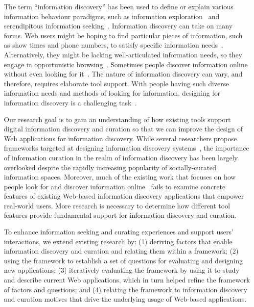 \documentclass[review]{elsarticle}
\begin{document}
The term ``information discovery'' has been used to define or explain various information behaviour paradigms, such as information exploration~\cite{waterworth1991model} and serendipitous information seeking~\cite{foster2003serendipity}.  
Information discovery can take on many forms. Web users might be hoping to find particular pieces of information, such as show times and phone numbers, to satisfy specific information needs~\cite{proper1999information}. Alternatively, they might be lacking well-articulated information needs, so they engage in opportunistic browsing~\cite{lindley2012s}. Sometimes people discover information online without even looking for it~\cite{bates1986exploratory}. The nature of information discovery can vary, and therefore, requires elaborate tool support. With people having such diverse information needs and methods of looking for information, designing for information discovery is a challenging task~\cite{conaway2010designing, marchionini2006exploratory}.

Our research goal is to gain an understanding of how existing tools support digital information discovery and curation so that we can improve the design of Web applications for information discovery. While several researchers propose frameworks targeted at designing information discovery systems~\cite{proper1999information, kerne2004information}, the importance of information curation in the realm of information discovery has been largely overlooked despite the rapidly increasing popularity of socially-curated information spaces. Moreover, much of the existing work that focuses on how people look for and discover information online~\cite{bates1986exploratory, choo2000information, ellis1989behavioural, kellar2006goal, lindley2012s, morrison2001taxonomic, sellen2002knowledge} fails to examine concrete features of existing Web-based information discovery applications that empower real-world users. More research is necessary to determine how different tool features provide fundamental support for information discovery and curation.

To enhance information seeking and curating experiences and support users' interactions, we extend existing research by: (1) deriving factors that enable information discovery and curation and relating them within a framework; (2) using the framework to establish a set of questions for evaluating and designing new applications; (3) iteratively evaluating the framework by using it to study and describe current Web applications, which in turn helped refine the framework of factors and questions; and (4) relating the framework to information discovery and curation motives that drive the underlying usage of Web-based applications.
\end{document}
